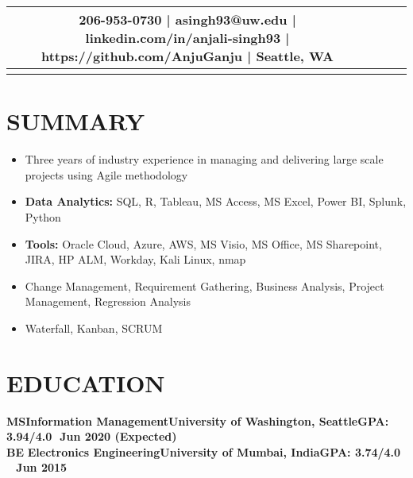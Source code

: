 \documentclass[11.5pt,a4paper,roman]{moderncv}        %
\begin{document}
\makecvtitle
\vspace*{-19mm}

\begin{center}
\begin{tabular}{ c c c c }
   206-953-0730  | asingh93@uw.edu | linkedin.com/in/anjali-singh93 | https://github.com/AnjuGanju | Seattle, WA \\  
\hline
\vspace*{-7mm}
\end{tabular}
\end{center}


\section{\large SUMMARY}

\vspace{-1mm} 
\begin{itemize}
\renewcommand{\labelitemi}{$\bullet$}
\item Three years of industry experience in managing and delivering large scale projects using Agile methodology
 \item \textbf{Data Analytics:} SQL, R, Tableau, MS Access, MS Excel, Power BI, Splunk, Python
 \item \textbf{Tools:} Oracle Cloud, Azure, AWS, MS Visio, MS Office, MS Sharepoint, JIRA, HP ALM, Workday, Kali Linux, nmap
 \item Change Management, Requirement Gathering, Business Analysis, Project Management, Regression Analysis
 \item Waterfall, Kanban, SCRUM
 \end{itemize}
 \vspace{-3mm} 

\section{\large EDUCATION}


\textbf{MS\quad\quad Information Management\quad\quad University of Washington, Seattle\quad\quad GPA: 3.94/4.0\quad\,\, Jun 2020 (Expected)\\}
\textbf{BE\quad\quad\,\,Electronics Engineering\quad\quad\quad University of Mumbai, India\quad\quad\quad\quad GPA: 3.74/4.0 \quad\quad\quad\quad\quad\,\,\, Jun 2015\\}
 \vspace{-8mm} 
\end{document}

